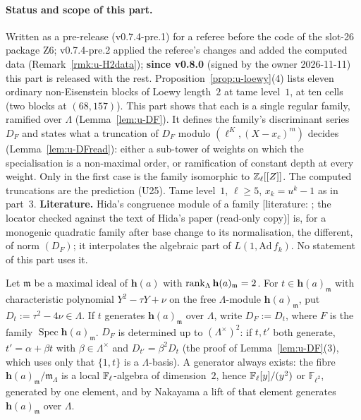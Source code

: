 \documentclass[11pt]{article}
\newcommand{\LIT}[1]{\textsf{[literature: #1]}}   %
\newcommand{\Iw}{\Lambda}                         %
\newcommand{\hcusp}{\mathbf{h}}                   %
\newcommand{\Zl}{\Z_\ell}
\begin{document}
\paragraph{Status and scope of this part.} Written as a pre-release (v0.7.4-pre.1) for a referee before the code of the slot-26 package Z6; v0.7.4-pre.2
applied the referee's changes and added the computed data (Remark~\ref{rmk:u-H2data}); \textbf{since v0.8.0} (signed by the owner 2026-11-11) this part is released with the rest.
Proposition~\ref{prop:u-loewy}(4) lists eleven ordinary non-Eisenstein blocks of Loewy length~$2$ at tame level~$1$, at ten cells (two blocks at $(68,157)$). This
part shows that each is a single regular family, ramified over $\Iw$ (Lemma~\ref{lem:u-DF}). It defines the family's discriminant series $D_F$ and states what a
truncation of $D_F$ modulo $(\ell^{K},(X-x_c)^{m})$ decides (Lemma~\ref{lem:u-DFread}): either a sub-tower of weights on which the specialisation is a non-maximal order, or
ramification of constant depth at every weight. Only in the first case is the family isomorphic to $\Zl[[Z]]$. The computed truncations are the prediction (U25).
Tame level~$1$, $\ell\ge5$, $x_k=u^{k}-1$ as in part~3.
\textbf{Literature.} Hida's congruence module of a family \LIT{\cite[Thm.~0.1, p.~329]{hida_ajm88}; the locator checked against the text of Hida's paper (read-only copy)} is, for a monogenic quadratic family after base change to its normalisation, the different, of norm $(D_F)$;
it interpolates the algebraic part of $L(1,\mathrm{Ad}\,f_k)$. No statement of this part uses it.

\begin{definition}\label{def:u-DF}
Let $\mathfrak m$ be a maximal ideal of $\hcusp(a)$ with $\rank_\Iw\hcusp(a)_{\mathfrak m}=2$. For $t\in\hcusp(a)_{\mathfrak m}$ with characteristic polynomial $Y^{2}-\tau Y+\nu$ on the free
$\Iw$-module $\hcusp(a)_{\mathfrak m}$, put $D_t:=\tau^{2}-4\nu\in\Iw$. If $t$ generates $\hcusp(a)_{\mathfrak m}$ over $\Iw$, write $D_F:=D_t$, where $F$ is the family
$\operatorname{Spec}\hcusp(a)_{\mathfrak m}$. $D_F$ is determined up to $(\Iw^{\times})^{2}$: if $t,t'$ both generate,
$t'=\alpha+\beta t$ with $\beta\in\Iw^{\times}$ and $D_{t'}=\beta^{2}D_t$ (the proof of Lemma~\ref{lem:u-DF}(3), which uses only that
$\{1,t\}$ is a $\Iw$-basis). A generator always exists: the fibre $\hcusp(a)_{\mathfrak m}/\mathfrak m_\Iw$ is a local $\mathbb{F}_\ell$-algebra of dimension~$2$, hence $\mathbb{F}_\ell[y]/(y^{2})$ or $\mathbb F_{\ell^{2}}$,
generated by one element, and by Nakayama a lift of that element generates $\hcusp(a)_{\mathfrak m}$ over $\Iw$.
\end{definition}
\end{document}
